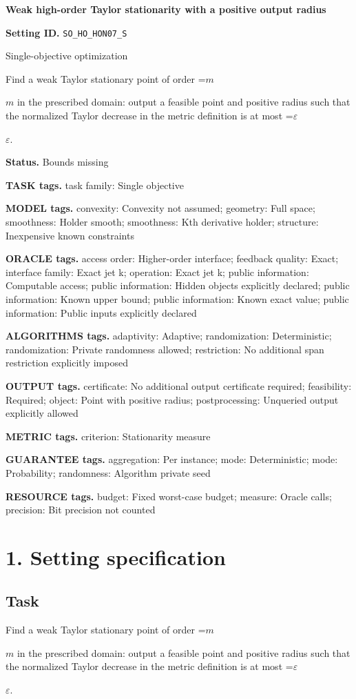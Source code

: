 \documentclass[10pt,a4paper]{article}
\newcommand{\AtlasMath}[1]{\par\begingroup\centering\setbox0=\hbox{$\displaystyle #1$}\ifdim\wd0>1.4\linewidth\typeout{ATLAS WIDE FORMULA: \the\wd0}\fi\ifdim\wd0>\linewidth\resizebox{\linewidth}{!}{\box0}\else\box0\fi\par\endgroup}
\newcommand{\AtlasInlineMath}[1]{\begingroup\setbox0=\hbox{$#1$}\ifdim\wd0>.4\linewidth\endgroup\AtlasMath{#1}\else\endgroup$#1$\fi}
\begin{document}
\raggedright

{\LARGE\bfseries\sffamily\color{AtlasNavy} Weak high-order Taylor stationarity with a positive output radius\par}\vspace{5pt}
\textbf{Setting ID.} \texttt{SO\_\allowbreak{}HO\_\allowbreak{}HON07\_\allowbreak{}S}

Single-objective optimization

Find a weak Taylor stationary point of order \AtlasInlineMath{m} in the prescribed domain: output a feasible point and positive radius such that the normalized Taylor decrease in the metric definition is at most \AtlasInlineMath{\varepsilon}.

\textbf{Status.} Bounds missing

\textbf{TASK tags.} task family: Single objective

\textbf{MODEL tags.} convexity: Convexity not assumed; geometry: Full space; smoothness: Holder smooth; smoothness: Kth derivative holder; structure: Inexpensive known constraints

\textbf{ORACLE tags.} access order: Higher-order interface; feedback quality: Exact; interface family: Exact jet k; operation: Exact jet k; public information: Computable access; public information: Hidden objects explicitly declared; public information: Known upper bound; public information: Known exact value; public information: Public inputs explicitly declared

\textbf{ALGORITHMS tags.} adaptivity: Adaptive; randomization: Deterministic; randomization: Private randomness allowed; restriction: No additional span restriction explicitly imposed

\textbf{OUTPUT tags.} certificate: No additional output certificate required; feasibility: Required; object: Point with positive radius; postprocessing: Unqueried output explicitly allowed

\textbf{METRIC tags.} criterion: Stationarity measure

\textbf{GUARANTEE tags.} aggregation: Per instance; mode: Deterministic; mode: Probability; randomness: Algorithm private seed

\textbf{RESOURCE tags.} budget: Fixed worst-case budget; measure: Oracle calls; precision: Bit precision not counted

\section{1. Setting specification}
\subsection{Task}
Find a weak Taylor stationary point of order \AtlasInlineMath{m} in the prescribed domain: output a feasible point and positive radius such that the normalized Taylor decrease in the metric definition is at most \AtlasInlineMath{\varepsilon}.
\end{document}

